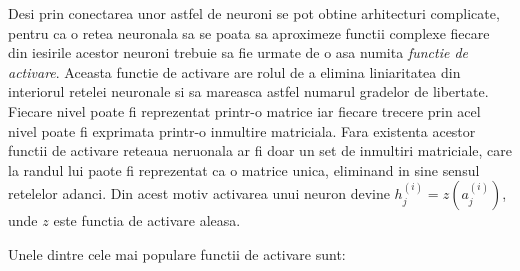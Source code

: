 \documentclass[a4paper,12pt]{book}
\begin{document}
			Desi prin conectarea unor astfel de neuroni se pot obtine arhitecturi complicate, pentru ca o retea neuronala sa se poata sa aproximeze functii complexe fiecare din iesirile acestor neuroni trebuie sa fie urmate de o asa numita \textit{functie de activare}. Aceasta functie de activare are rolul de a elimina liniaritatea din interiorul retelei neuronale si sa mareasca astfel numarul gradelor de libertate. Fiecare nivel poate fi reprezentat printr-o matrice iar fiecare trecere prin acel nivel poate fi exprimata printr-o inmultire matriciala. Fara existenta acestor functii de activare reteaua neruonala ar fi doar un set de inmultiri matriciale, care la randul lui paote fi reprezentat ca o matrice unica, eliminand in sine sensul retelelor adanci. Din acest motiv activarea unui neuron devine $h_j^{(i)} = z(a_j^{(i)})$, unde $z$ este functia de activare aleasa. \par
			\noindent Unele dintre cele mai populare functii de activare sunt:
\end{document}
